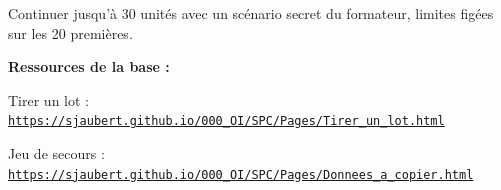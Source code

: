 \documentclass[10pt,a4paper]{article}
\begin{document}
\begin{tcolorbox}[plus]Continuer jusqu'à 30 unités avec un scénario secret du formateur, limites figées sur les 20 premières.\end{tcolorbox}
\vfill{\footnotesize\color{uimm}\textbf{Ressources de la base :}\par Tirer un lot : \href{https://sjaubert.github.io/000_OI/SPC/Pages/Tirer_un_lot.html}{\nolinkurl{https://sjaubert.github.io/000_OI/SPC/Pages/Tirer_un_lot.html}}\par Jeu de secours : \href{https://sjaubert.github.io/000_OI/SPC/Pages/Donnees_a_copier.html\#panneaux}{\nolinkurl{https://sjaubert.github.io/000_OI/SPC/Pages/Donnees_a_copier.html}}}
\end{document}
